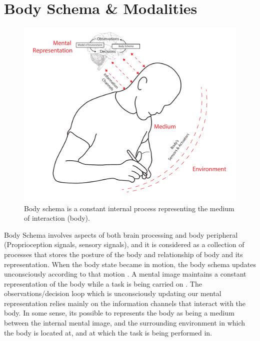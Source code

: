 \section{Body Schema \& Modalities}
\label{sec:intro-bodyschema}

\begin{figure}[b!]
  \centering
	  \includegraphics[width=0.75\linewidth]{figures/intro/BodyInteraction.pdf}
  \captionsetup{justification=centering}
  \caption{Body schema is a constant internal process representing the medium of interaction (body).}
  \label{fig:intro-bodymodel}
\end{figure}

Body Schema involves aspects of both brain processing and body peripheral (Proprioception signals, sensory signals), and it is considered as a collection of processes that stores the posture of the body and relationship of body and its representation. When the body state became in motion, the body schema updates unconsciously according to that motion \cite{holmes2004body}. A mental image maintains a constant representation of the body while a task is being carried on . The observations/decision loop which is unconsciously updating our mental representation relies mainly on the information channels that interact with the body. In some sense, its possible to represents the body as being a medium between the internal mental image, and the surrounding environment in which the body is located at, and at which the task is being performed in. 

